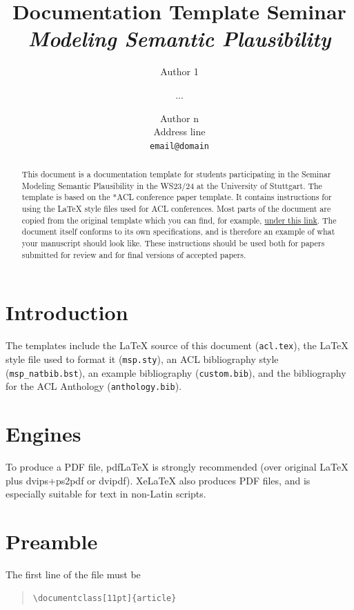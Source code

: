 \documentclass[11pt]{article}
\title{Documentation Template Seminar \textit{Modeling Semantic Plausibility}}
\author{Author 1 \and ... \and Author n \\         
Address line \\ \texttt{email@domain}}
\begin{document}
\maketitle
\begin{abstract}
This document is a documentation template for students participating in the Seminar Modeling Semantic Plausibility in the WS23/24 at the University of Stuttgart. The template is based on the *ACL conference paper template. It contains instructions for using the \LaTeX{} style files used for ACL conferences. Most parts of the document are copied from the original template which you can find, for example, \href{https://www.overleaf.com/latex/templates/acl-rolling-review-template/jxbhdzhmcpdm}{under this link}.
The document itself conforms to its own specifications, and is therefore an example of what your manuscript should look like.
These instructions should be used both for papers submitted for review and for final versions of accepted papers.
\end{abstract}

\section{Introduction}

The templates include the \LaTeX{} source of this document (\texttt{acl.tex}),
the \LaTeX{} style file used to format it (\texttt{msp.sty}),
an ACL bibliography style (\texttt{msp\_natbib.bst}),
an example bibliography (\texttt{custom.bib}),
and the bibliography for the ACL Anthology (\texttt{anthology.bib}).

\section{Engines}

To produce a PDF file, pdf\LaTeX{} is strongly recommended (over original \LaTeX{} plus dvips+ps2pdf or dvipdf). Xe\LaTeX{} also produces PDF files, and is especially suitable for text in non-Latin scripts.

\section{Preamble}

The first line of the file must be
\begin{quote}
\begin{verbatim}
\documentclass[11pt]{article}
\end{verbatim}
\end{quote}
\end{document}
